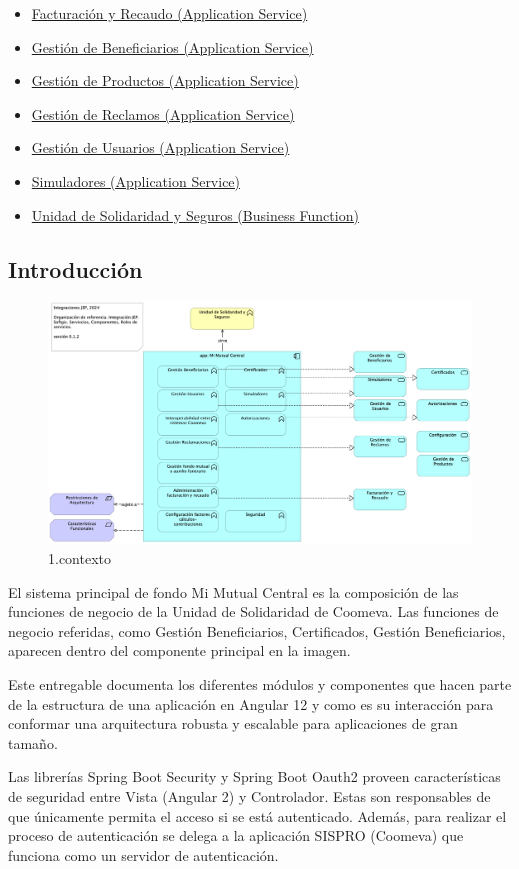 \documentclass[
  paper=a4,
  ,captions=tableheading
]{scrartcl}
\begin{document}
\begin{itemize}
{  (Application Service)}
\item
  \hyperref[facturaciuxf3n-y-recaudo-application-service]{Facturación y
  Recaudo (Application Service)}
\item
  \hyperref[gestiuxf3n-de-beneficiarios-application-service]{Gestión de
  Beneficiarios (Application Service)}
\item
  \hyperref[gestiuxf3n-de-productos-application-service]{Gestión de
  Productos (Application Service)}
\item
  \hyperref[gestiuxf3n-de-reclamos-application-service]{Gestión de
  Reclamos (Application Service)}
\item
  \hyperref[gestiuxf3n-de-usuarios-application-service]{Gestión de
  Usuarios (Application Service)}
\item
  \hyperref[simuladores-application-service]{Simuladores (Application
  Service)}
\item
  \hyperref[unidad-de-solidaridad-y-seguros-business-function]{Unidad de
  Solidaridad y Seguros (Business Function)}
\end{itemize}

\subsection{Introducción}\label{sec:introducciuxf3n-2}

\begin{figure}
\centering
\includegraphics{01.prop.contexto.png}
\caption{1.contexto}
\end{figure}

El sistema principal de fondo Mi Mutual Central es la composición de las
funciones de negocio de la Unidad de Solidaridad de Coomeva. Las
funciones de negocio referidas, como Gestión Beneficiarios,
Certificados, Gestión Beneficiarios, aparecen dentro del componente
principal en la imagen.

Este entregable documenta los diferentes módulos y componentes que hacen
parte de la estructura de una aplicación en Angular 12 y como es su
interacción para conformar una arquitectura robusta y escalable para
aplicaciones de gran tamaño.

Las librerías Spring Boot Security y Spring Boot Oauth2 proveen
características de seguridad entre Vista (Angular 2) y Controlador.
Estas son responsables de que únicamente permita el acceso si se está
autenticado. Además, para realizar el proceso de autenticación se delega
a la aplicación SISPRO (Coomeva) que funciona como un servidor de
autenticación.
\end{document}
